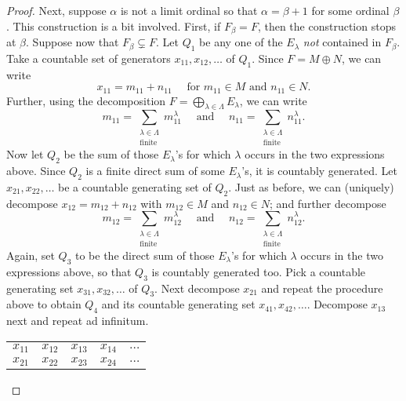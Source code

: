 \begin{proof}
    Next, suppose $\alpha$ is not a limit ordinal so that $\alpha = \beta + 1$ for some ordinal $\beta$. This construction is a bit involved. First, if $F_\beta = F$, then the construction stops at $\beta$. Suppose now that $F_\beta\subsetneq F$. Let $Q_1$ be any one of the $E_\lambda$ \emph{not} contained in $F_\beta$. Take a countable set of generators $x_{11}, x_{12},\dots$ of $Q_1$. Since $F = M\oplus N$, we can write 
    \begin{equation*}
        x_{11} = m_{11} + n_{11} \quad\text{ for }m_{11}\in M\text{ and } n_{11}\in N.
    \end{equation*}
    Further, using the decomposition $\displaystyle F = \bigoplus_{\lambda\in\Lambda} E_\lambda$, we can write 
    \begin{equation*}
        m_{11} = \sum_{\substack{\lambda\in\Lambda\\\text{finite}}} m_{11}^\lambda\quad\text{ and }\quad n_{11} = \sum_{\substack{\lambda\in\Lambda\\\text{finite}}} n_{11}^\lambda.
    \end{equation*}
    Now let $Q_2$ be the sum of those $E_\lambda$'s for which $\lambda$ occurs in the two expressions above. Since $Q_2$ is a finite direct sum of some $E_\lambda$'s, it is countably generated. Let $x_{21},x_{22},\dots$ be a countable generating set of $Q_2$. Just as before, we can (uniquely) decompose $x_{12} = m_{12} + n_{12}$ with $m_{12}\in M$ and $n_{12}\in N$; and further decompose 
    \begin{equation*}
        m_{12} = \sum_{\substack{\lambda\in\Lambda\\\text{finite}}} m_{12}^\lambda\quad\text{ and }\quad n_{12} = \sum_{\substack{\lambda\in\Lambda\\\text{finite}}} n_{12}^\lambda.
    \end{equation*}
    Again, set $Q_3$ to be the direct sum of those $E_\lambda$'s for which $\lambda$ occurs in the two expressions above, so that $Q_3$ is countably generated too. Pick a countable generating set $x_{31},x_{32},\dots$ of $Q_3$. Next decompose $x_{21}$ and repeat the procedure above to obtain $Q_4$ and its countable generating set $x_{41}, x_{42},\dots$. Decompose $x_{13}$ next and repeat ad infinitum.
    \begin{center}
        \begin{tabular}{ccccc}
            $x_{11}$ & $x_{12}$ & $x_{13}$ & $x_{14}$ & $\dots$\\
            $x_{21}$ & $x_{22}$ & $x_{23}$ & $x_{24}$ & $\dots$\\

\end{tabular}
\end{center}
\end{proof}
